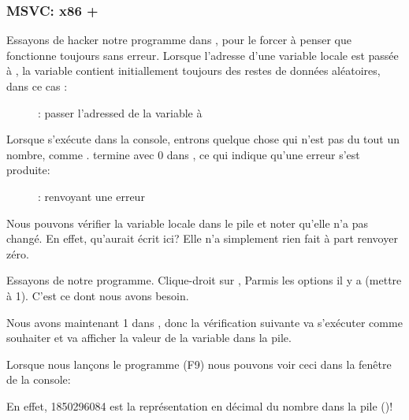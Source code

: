 \clearpage
\subsubsection{MSVC: x86 + \olly}

Essayons de hacker notre programme dans \olly, pour le forcer à penser que \scanf
fonctionne toujours sans erreur.
Lorsque l'adresse d'une variable locale est passée à \scanf, la variable contient
initiallement toujours des restes de données aléatoires, dans ce cas :

\begin{figure}[H]
\centering
{}
\caption{\olly: passer l'adressed de la variable à \scanf}
\label{fig:scanf_ex3_olly_1}
\end{figure}

\clearpage
Lorsque \scanf s'exécute dans la console, entrons quelque chose qui n'est pas du
tout un nombre, comme .
\scanf termine avec 0 dans \EAX, ce qui indique qu'une erreur s'est produite:

\begin{figure}[H]
\centering
{}
\caption{\olly: \scanf renvoyant une erreur}
\label{fig:scanf_ex3_olly_2}
\end{figure}

Nous pouvons vérifier la variable locale dans le pile et noter qu'elle n'a pas changé.
En effet, qu'aurait écrit \scanf ici?
Elle n'a simplement rien fait à part renvoyer zéro.

Essayons de  notre programme.
Clique-droit sur \EAX,
Parmis les options il y a  (mettre à 1).
C'est ce dont nous avons besoin.

Nous avons maintenant 1 dans \EAX, donc la vérification suivante va s'exécuter comme
souhaiter et \printf va afficher la valeur de la variable dans la pile.

Lorsque nous lançons le programme (F9) nous pouvons voir ceci dans la fenêtre
de la console:



En effet, 1850296084 est la représentation en décimal du nombre dans la pile ()!
